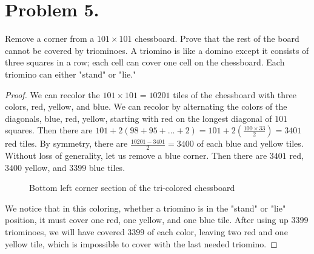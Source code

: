 \documentclass{article}
\begin{document}
\section{Problem 5.}
Remove a corner from a $101\times 101$ chessboard. Prove that the rest of the board cannot be covered by triominoes. A triomino is like a domino except it consists of three squares in a row; each cell can cover one cell on the chessboard. Each triomino can either "stand" or "lie."
\begin{proof}
We can recolor the $101\times 101=10201$ tiles of the chessboard with three colors, red, yellow, and blue. We can recolor by alternating the colors of the diagonals, blue, red, yellow, starting with red on the longest diagonal of $101$ squares. Then there are $101+2(98+95+\dots+2)=101+2 \left (\frac{100\times 33}{2}\right )=3401$ red tiles. By symmetry, there are $\frac{10201-3401}{2}=3400$ of each blue and yellow tiles. Without loss of generality, let us remove a blue corner. Then there are $3401$ red, $3400$ yellow, and $3399$ blue tiles.

\begin{figure}[h]
    \centering
    
    \caption{Bottom left corner section of the tri-colored chessboard}
\end{figure}

\par We notice that in this coloring, whether a triomino is in the "stand" or "lie" position, it must cover one red, one yellow, and one blue tile. After using up $3399$ triominoes, we will have covered $3399$ of each color, leaving two red and one yellow tile, which is impossible to cover with the last needed triomino.
\end{proof}
\end{document}
